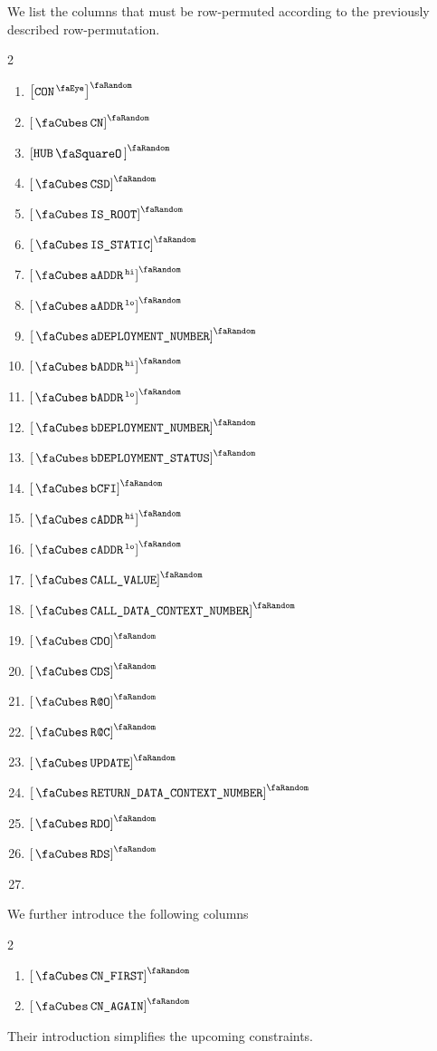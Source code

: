 We list the columns that must be row-permuted according to the previously described row-permutation.
\begin{multicols}{2}
	\begin{enumerate}
		\item $\order{\peekContext}$
		\item $\order{\cnCn}$
		\item $\order{\hubStamp}$
		\item $\order{\cnCsd}$
		\item $\order{\cnIsRootContext}$
		\item $\order{\cnStatic}$
		\item $\order{\cnAccountAddress\high}$
		\item $\order{\cnAccountAddress\low}$
		\item $\order{\cnAccDepNum}$
		\item $\order{\cnCodeAddress\high}$
		\item $\order{\cnCodeAddress\low}$
		\item $\order{\cnCodeDepNum}$
		\item $\order{\cnCodeDepStatus}$
		\item $\order{\cnCodeCfi}$
		\item $\order{\cnCallerAddress\high}$
		\item $\order{\cnCallerAddress\low}$
		\item $\order{\cnCallValue}$
		\item $\order{\cnCallDataContextNumber}$
		\item $\order{\cnCdo}$
		\item $\order{\cnCds}$
		\item $\order{\cnRao}$
		\item $\order{\cnRac}$
		\item $\order{\cnUpdate}$
		\item $\order{\cnReturner}$
		\item $\order{\cnRdo}$
		\item $\order{\cnRds}$
		\item[\vspace{\fill}]
	\end{enumerate}
\end{multicols}
\noindent We further introduce the following columns
\begin{multicols}{2}
        \begin{enumerate}
		\item $\conContextFirst$
		\item $\conContextAgain$
        \end{enumerate}
\end{multicols}
\noindent Their introduction simplifies the upcoming constraints.
